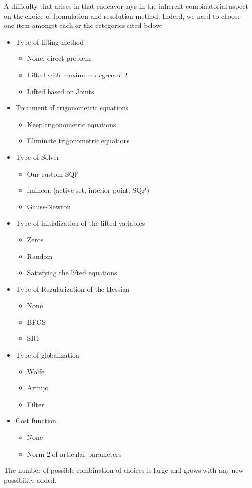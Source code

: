 A difficulty that arises in that endeavor lays in the inherent combinatorial aspect on the choice of formulation and resolution method.
Indeed, we need to choose one item amongst each or the categories cited below:
\begin{itemize}
  \item Type of lifting method
  \begin{itemize}
    \item None, direct problem
    \item Lifted with maximum degree of 2
    \item Lifted based on Joints
  \end{itemize}
  \item Treatment of trigonometric equations
  \begin{itemize}
    \item Keep trigonometric equations
    \item Eliminate trigonometric equations
  \end{itemize}
  \item Type of Solver
  \begin{itemize}
    \item Our custom SQP
    \item fmincon (active-set, interior point, SQP)
    \item Gauss-Newton
  \end{itemize}
  \item Type of initialization of the lifted variables
  \begin{itemize}
    \item Zeros
    \item Random
    \item Satisfying the lifted equations
  \end{itemize}
  \item Type of Regularization of the Hessian
  \begin{itemize}
    \item None
    \item BFGS
    \item SR1
  \end{itemize}
  \item Type of globalization
  \begin{itemize}
    \item Wolfe
    \item Armijo
    \item Filter
  \end{itemize}
  \item Cost function
  \begin{itemize}
    \item None
    \item Norm 2 of articular parameters
  \end{itemize}
\end{itemize}
The number of possible combination of choices is large and grows with any new possibility added.

